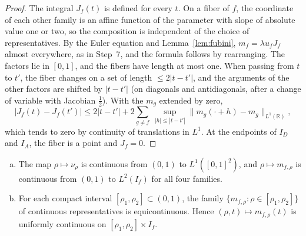 \begin{proof} The integral $J_f(t)$ is defined for every $t$. On a fiber of $f$, the coordinate of each other family is an affine
function of the parameter with slope of absolute value one or two, so the composition is independent of the choice of representatives.
By the Euler equation and Lemma~\ref{lem:fubini}, $m_f=\lambda u_fJ_f$ almost everywhere, as in Step~7, and the formula follows by
rearranging. The factors lie in $[0,1]$, and the fibers have length at most one. When passing from $t$ to $t'$, the fiber changes on a
set of length $\le2|t-t'|$, and the arguments of the other factors are shifted by $|t-t'|$ (on diagonals and antidiagonals, after a
change of variable with Jacobian $\frac12$). With the $m_g$ extended by zero, \[
 |J_f(t)-J_f(t')|\le2|t-t'|+2\sum_{g\ne f}\ \sup_{|h|\le|t-t'|}\|m_g(\cdot+h)-m_g\|_{L^1(\mathbb R)},
\] which tends to zero by continuity of translations in $L^1$. At the endpoints of $I_D$ and $I_A$, the fiber is a point and $J_f=0$. \end{proof}

\begin{proposicion}\label{prop:continuidad} \begin{enumerate}[(a)] \item The map $\rho\mapsto\nu_\rho$
is continuous from $(0,1)$ to $L^1([0,1]^2)$, and $\rho\mapsto m_{f,\rho}$ is continuous from $(0,1)$ to $L^2(I_f)$ for all four
families. \item For each compact interval $[\rho_1,\rho_2]\subset(0,1)$, the family $\{m_{f,\rho}:\rho\in[\rho_1,\rho_2]\}$ of
continuous representatives is equicontinuous. Hence $(\rho,t)\mapsto m_{f,\rho}(t)$ is uniformly continuous on $[\rho_1,\rho_2]\times
I_f$. \end{enumerate} \end{proposicion}

